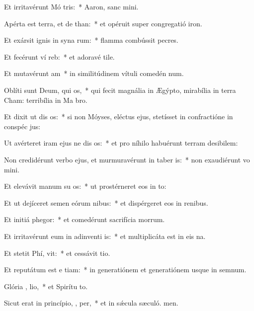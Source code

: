 \item Et irritavérunt Mó  tris:~* Aaron, sanc mini.
\item Apérta est terra, et de than:~* et opéruit super congregatió iron.
\item Et exársit ignis in syna rum:~* flamma combússit pecres.
\item Et fecérunt ví  reb:~* et adoravé tile.
\item Et mutavérunt  am~* in similitúdinem vítuli comedén num.
\item Oblíti sunt Deum, qui  os,~* qui fecit magnália in Ægýpto, mirabília in terra Cham: terribília in Ma bro.
\item Et dixit ut dis os:~* si non Móyses, eléctus ejus, stetísset in confractióne in conspéc jus:
\item Ut avérteret iram ejus ne dis os:~* et pro níhilo habuérunt terram desibilem:
\item Non credidérunt verbo ejus, et murmuravérunt in taber is:~* non exaudiérunt vo mini.
\item Et elevávit manum su  os:~* ut prostérneret eos in to:
\item Et ut dejíceret semen eórum  nibus:~* et dispérgeret eos in renibus.
\item Et initiá  phegor:~* et comedérunt sacrifícia morrum.
\item Et irritavérunt eum in adinventi is:~* et multiplicáta est in eis na.
\item Et stetit Phí,  vit:~* et cessávit tio.
\item Et reputátum est e  tiam:~* in generatiónem et generatiónem usque in semnum.
\item Glória ,  lio,~* et Spirítu to.
\item Sicut erat in princípio,  ,  per,~* et in sǽcula sæculó. men.
